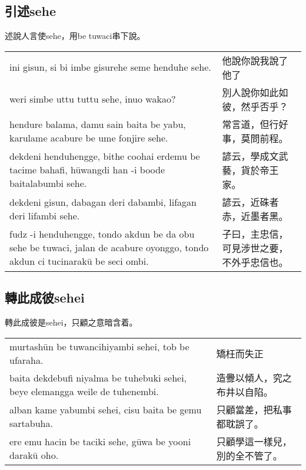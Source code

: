 \documentclass{article}
\begin{document}
\subsection{引述sehe}
\noindent 述說人言使sehe，用be tuwaci串下說。
\begin{center}
    \begin{tabularx}{\textwidth}{XX}
        ini gisun, si bi imbe gisurehe seme henduhe sehe. & 他說你說我說了他了\\
        weri simbe uttu tuttu sehe, inuo wakao? & 別人說你如此如彼，然乎否乎？\\
        hendure balama, damu sain baita be yabu, karulame acabure be ume fonjire sehe. & 常言道，但行好事，莫問前程。\\
        dekdeni henduhengge, bithe coohai erdemu be tacime bahafi, h\={u}wangdi han -i boode baitalabumbi sehe. &諺云，學成文武藝，貨於帝王家。\\
        dekdeni gisun, dabagan deri dabambi, lifagan deri lifambi sehe. &諺云，近硃者赤，近墨者黑。\\
        fudz -i henduhengge, tondo akdun be da obu sehe be tuwaci, jalan de acabure oyonggo, tondo akdun ci tucinarak\={u} be seci ombi.& 子曰，主忠信，可見涉世之要，不外乎忠信也。
    \end{tabularx}
\end{center}

\subsection{轉此成彼sehei}
\noindent 轉此成彼是sehei，只顧之意暗含着。
\begin{center}
    \begin{tabularx}{\textwidth}{XX}
        murtash\={u}n be tuwancihiyambi sehei, tob be ufaraha. &矯枉而失正\\
        baita dekdebufi niyalma be tuhebuki sehei, beye elemangga weile de tuhenembi. &造釁以傾人，究之布井以自陷。\\
        alban kame yabumbi sehei, cisu baita be gemu sartabuha. & 只顧當差，把私事都耽誤了。\\
        ere emu hacin be taciki sehe, g\={u}wa be yooni darak\={u} oho. & 只顧學這一樣兒，別的全不管了。
    \end{tabularx}
\end{center}
\end{document}
